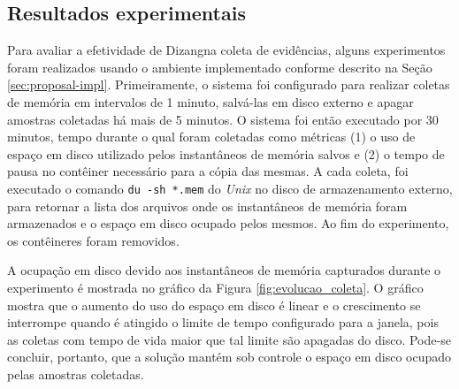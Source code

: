 \documentclass[conference]{IEEEtran}
\newcommand{\fancyname}{Dizang}
\begin{document}
%

\subsection{Resultados experimentais}
\label{sec:proposal-exp}

Para avaliar a efetividade de \fancyname na coleta de evidências, alguns experimentos foram realizados usando o ambiente implementado conforme descrito na Seção \ref{sec:proposal-impl}.
%
Primeiramente, o sistema foi configurado para realizar coletas de memória em intervalos de 1 minuto, salvá-las em disco externo e apagar amostras coletadas há mais de 5 minutos. 
%
O sistema foi então executado por 30 minutos, tempo durante o qual foram coletadas como métricas (1) o uso de espaço em disco utilizado pelos instantâneos de memória salvos e (2) o tempo de pausa no contêiner necessário para a cópia das mesmas.
%
A cada coleta, foi executado o comando \texttt{du -sh *.mem} do \textit{Unix} no disco de armazenamento externo, para retornar a lista dos arquivos onde os instantâneos de memória foram armazenados e o espaço em disco ocupado pelos mesmos. 
%
Ao fim do experimento, os contêineres foram removidos.


A ocupação em disco devido aos instantâneos de memória capturados durante o experimento é mostrada no gráfico da Figura \ref{fig:evolucao_coleta}. 
%
O gráfico mostra que o aumento do uso do espaço em disco é linear e o crescimento se interrompe quando é atingido o limite de tempo configurado para a janela, pois as coletas com tempo de vida maior que tal limite são apagadas do disco. 
%
Pode-se concluir, portanto, que a solução mantém sob controle o espaço em disco ocupado pelas amostras coletadas.
%
\end{document}

